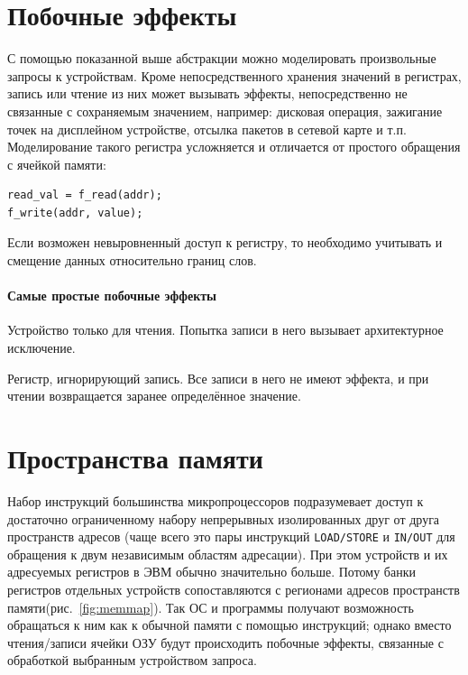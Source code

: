 \section{Побочные эффекты}

С помощью показанной выше абстракции можно моделировать произвольные запросы к устройствам. Кроме непосредственного хранения значений в регистрах, запись или чтение из них может вызывать эффекты, непосредственно не связанные с сохраняемым значением, например: дисковая операция, зажигание точек на дисплейном устройстве, отсылка пакетов в сетевой карте и т.п. Моделирование такого регистра усложняется и отличается от простого обращения с ячейкой памяти:
\begin{lstlisting}
read_val = f_read(addr);
f_write(addr, value);    
\end{lstlisting}

Если возможен невыровненный доступ к регистру, то необходимо учитывать и смещение данных относительно границ слов. 

\paragraph{Самые простые побочные эффекты}
\begin{enumerate*}
\item Устройство только для чтения. Попытка записи в него вызывает архитектурное исключение.
\item Регистр, игнорирующий запись. Все записи в него не имеют эффекта, и при чтении возвращается заранее определённое значение.
\end{enumerate*}

\section{Пространства памяти}

Набор инструкций большинства микропроцессоров подразумевает доступ к достаточно ограниченному набору  непрерывных изолированных друг от друга пространств адресов  (чаще всего это пары инструкций \texttt{LOAD/STORE} и  \texttt{IN/OUT} для обращения к двум независимым областям адресации). При этом устройств и их адресуемых  регистров в ЭВМ обычно  значительно больше. Потому банки регистров отдельных устройств сопоставляются с регионами адресов пространств памяти(рис.~\ref{fig:memmap}). Так ОС и программы получают возможность обращаться к ним как к обычной памяти с помощью инструкций; однако вместо чтения/записи ячейки ОЗУ будут происходить побочные эффекты, связанные с обработкой выбранным устройством запроса.

